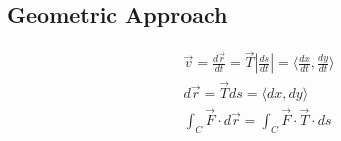 \documentclass{article}
\begin{document}
\subsection{Geometric Approach}

\begin{gather*}
  \vec{v} = \frac{d\vec{r}}{dt} = \vec{T} |\frac{ds}{dt}| = \langle \frac{dx}{dt}, \frac{dy}{dt} \rangle \\
  d\vec{r} = \vec{T} ds = \langle dx, dy \rangle \\
  \int_C \vec{F} \cdot d\vec{r} = \int_C \vec{F} \cdot \vec{T} \cdot ds \\
\end{gather*}
\end{document}
